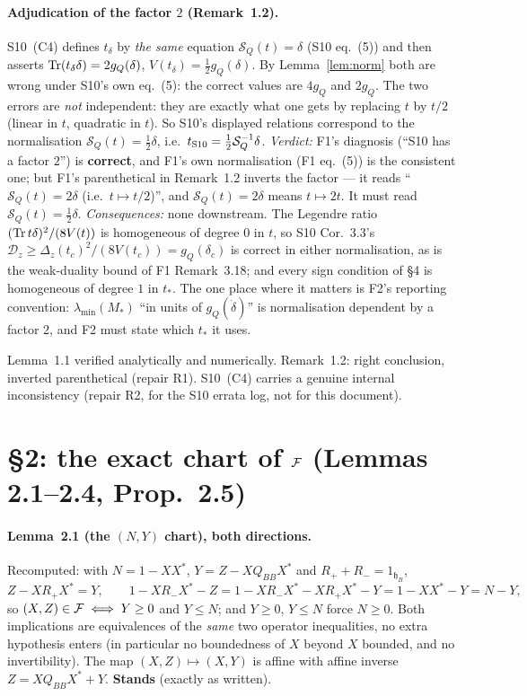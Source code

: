 \documentclass[11pt]{article}
\newcommand{\hh}{\mathfrak h}
\newcommand{\SLD}{\mathcal S_Q}
\begin{document}
\paragraph{Adjudication of the factor $2$ (Remark~1.2).}
S10~(C4) defines $t_\delta$ by \emph{the same} equation $\SLD(t)=\delta$ (S10 eq.~(5)) and
then asserts $\operatorname{Tr}(t_\delta\delta)=2g_Q(\delta)$, $V(t_\delta)=\frac12g_Q(\delta)$.  By
Lemma~\ref{lem:norm} both are wrong under S10's own eq.~(5): the correct values are
$4g_Q$ and $2g_Q$.  The two errors are \emph{not} independent: they are exactly what one
gets by replacing $t$ by $t/2$ (linear in $t$, quadratic in $t$).  So S10's displayed
relations correspond to the normalisation $\SLD(t)=\frac12\delta$, i.e.\ $t_{\rm S10}
=\frac12\SLD^{-1}\delta$.  \emph{Verdict:} F1's diagnosis (``S10 has a factor $2$'') is
\textbf{correct}, and F1's own normalisation (F1 eq.~(5)) is the consistent one; but
F1's parenthetical in Remark~1.2 inverts the factor --- it reads ``$\SLD(t)=2\delta$
(i.e.\ $t\mapsto t/2$)'', and $\SLD(t)=2\delta$ means $t\mapsto2t$.  It must read
$\SLD(t)=\frac12\delta$.  \emph{Consequences:} none downstream.  The Legendre ratio
$(\operatorname{Tr} t\delta)^2/(8V(t))$ is homogeneous of degree $0$ in $t$, so S10 Cor.~3.3's
$\mathcal D_z\ge\Delta_z(t_c)^2/(8V(t_c))=g_Q(\delta_c)$ is correct in either
normalisation, as is the weak-duality bound of F1 Remark~3.18; and every sign
condition of \S4 is homogeneous of degree $1$ in $t_*$.  The one place where it matters is
F2's reporting convention: $\lambda_{\min}(M_*)$ ``in units of $g_Q(\dot\delta)$'' is
normalisation dependent by a factor $2$, and F2 must state which $t_*$ it uses.
\begin{verdictok}[\;\S1]
Lemma~1.1 verified analytically and numerically.  Remark~1.2: right conclusion, inverted
parenthetical (repair R1).  S10~(C4) carries a genuine internal inconsistency (repair R2,
for the S10 errata log, not for this document).
\end{verdictok}

\section{\S2: the exact chart of $\mathcal F$ (Lemmas 2.1--2.4, Prop.~2.5)}\label{sec:chart}

\paragraph{Lemma~2.1 (the $(N,Y)$ chart), both directions.}  Recomputed: with
$N=1-XX^*$, $Y=Z-XQ_{BB}X^*$ and $R_++R_-=1_{\hh_B}$,
\[ Z-XR_+X^*=Y,\qquad 1-XR_-X^*-Z=1-XR_-X^*-XR_+X^*-Y=1-XX^*-Y=N-Y, \]
so $(X,Z)\in\mathcal F\iff Y\ge0$ and $Y\le N$; and $Y\ge0$, $Y\le N$ force $N\ge0$.  Both
implications are equivalences of the \emph{same} two operator inequalities, no extra
hypothesis enters (in particular no boundedness of $X$ beyond $X$ bounded, and no
invertibility).  The map $(X,Z)\mapsto(X,Y)$ is affine with affine inverse
$Z=XQ_{BB}X^*+Y$.  \textbf{Stands} (exactly as written).
\end{document}
